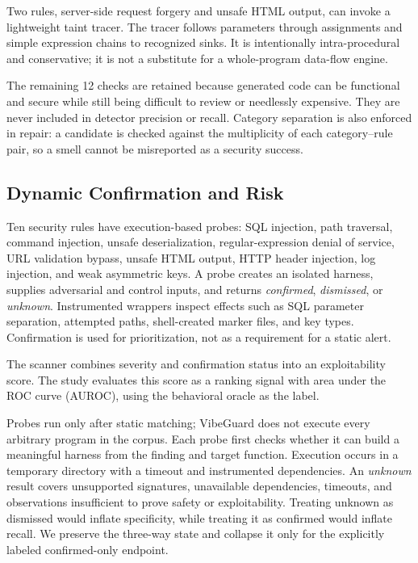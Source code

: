 \documentclass[sigconf,nonacm]{acmart}
\begin{document}
Two rules, server-side request forgery and unsafe HTML output, can invoke a
lightweight taint tracer. The tracer follows parameters through assignments and
simple expression chains to recognized sinks. It is intentionally
intra-procedural and conservative; it is not a substitute for a whole-program
data-flow engine.

The remaining 12 checks are retained because generated code can be functional
and secure while still being difficult to review or needlessly expensive.
They are never included in detector precision or recall. Category separation
is also enforced in repair: a candidate is checked against the multiplicity of
each category--rule pair, so a smell cannot be misreported as a security
success.

\subsection{Dynamic Confirmation and Risk}

Ten security rules have execution-based probes: SQL injection, path traversal,
command injection, unsafe deserialization, regular-expression denial of
service, URL validation bypass, unsafe HTML output, HTTP header injection, log
injection, and weak asymmetric keys. A probe creates an isolated harness,
supplies adversarial and control inputs, and returns \emph{confirmed},
\emph{dismissed}, or \emph{unknown}. Instrumented wrappers inspect effects such
as SQL parameter separation, attempted paths, shell-created marker files, and
key types. Confirmation is used for prioritization, not as a requirement for a
static alert.

The scanner combines severity and confirmation status into an exploitability
score. The study evaluates this score as a ranking signal with area under the
ROC curve (AUROC), using the behavioral oracle as the label.

Probes run only after static matching; VibeGuard does not execute every
arbitrary program in the corpus. Each probe first checks whether it can build a
meaningful harness from the finding and target function. Execution occurs in a
temporary directory with a timeout and instrumented dependencies. An
\emph{unknown} result covers unsupported signatures, unavailable dependencies,
timeouts, and observations insufficient to prove safety or exploitability.
Treating unknown as dismissed would inflate specificity, while treating it as
confirmed would inflate recall. We preserve the three-way state and collapse it
only for the explicitly labeled confirmed-only endpoint.
\end{document}
